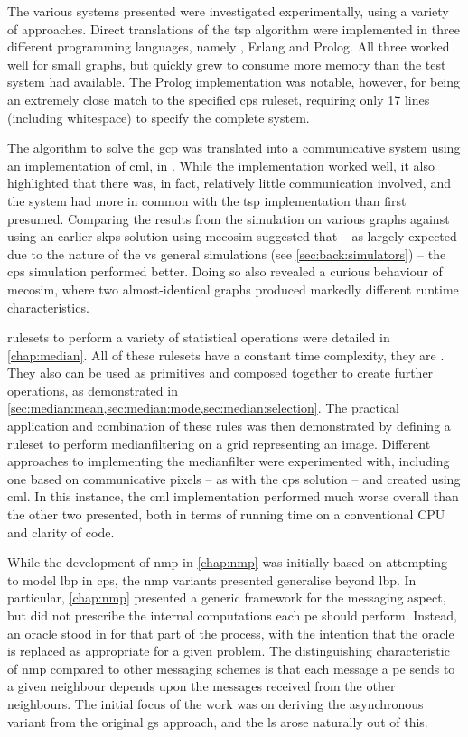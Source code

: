 The various systems presented were investigated experimentally, using a variety of approaches.  Direct translations of the \gls{tsp} algorithm were implemented in three different programming languages, namely \fsharp{}, Erlang and Prolog.  All three worked well for small graphs, but quickly grew to consume more memory than the test system had available.  The Prolog implementation was notable, however, for being an extremely close match to the specified \gls{cps} \gls{ruleset}, requiring only 17 lines (including whitespace) to specify the complete system.

The algorithm to solve the \gls{gcp} was translated into a communicative system using an implementation of \gls{cml}, \hopac{} in \fsharp{}.  While the implementation worked well, it also highlighted that there was, in fact, relatively little communication involved, and the system had more in common with the \gls{tsp} implementation than first presumed.  Comparing the results from the simulation on various graphs against using an earlier \gls{skps} solution using \gls{mecosim} suggested that -- as largely expected due to the nature of the \adhoc{} vs general simulations (see \vref{sec:back:simulators}) -- the \gls{cps} simulation performed better.  Doing so also revealed a curious behaviour of \gls{mecosim}, where two almost-identical graphs produced markedly different runtime characteristics.

\Glspl{ruleset} to perform a variety of statistical operations were detailed in \cref{chap:median}.  All of these rulesets have a constant time complexity, \ie{} they are .  They also can be used as primitives and composed together to create further operations, as demonstrated in \eg{} \cref{sec:median:mean,sec:median:mode,sec:median:selection}.  The practical application and combination of these rules was then demonstrated by defining a ruleset to perform \gls{medianfilter}ing on a grid representing an image.  Different approaches to implementing the \gls{medianfilter} were experimented with, including one based on communicative pixels -- as with the \gls{cps} solution -- and created using \gls{cml}.  In this instance, the \gls{cml} implementation performed much worse overall than the other two presented, both in terms of running time on a conventional CPU and clarity of code.

While the development of \gls{nmp} in \cref{chap:nmp} was initially based on attempting to model \gls{lbp} in \gls{cps}, the \gls{nmp} variants presented generalise beyond \gls{lbp}.  In particular, \cref{chap:nmp} presented a generic framework for the messaging aspect, but did not prescribe the internal computations each \gls{pe} should perform.  Instead, an oracle stood in for that part of the process, with the intention that the oracle is replaced as appropriate for a given problem.  The distinguishing characteristic of \gls{nmp} compared to other messaging schemes is that each message a \gls{pe} sends to a given neighbour depends upon the messages received from the other neighbours.  The initial focus of the work was on deriving the asynchronous variant from the original \gls{gs} approach, and the \gls{ls} arose naturally out of this.

